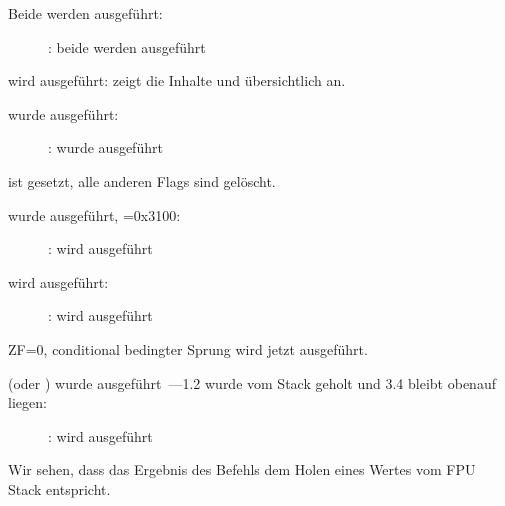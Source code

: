 \clearpage
{}
\myindex{\olly}

Beide \FLD werden ausgeführt:

\begin{figure}[H]
\centering
{}
\caption{\olly: beide \FLD werden ausgeführt}
\label{fig:FPU_comparison_Ox_case1_olly1}
\end{figure}

\FCOM wird ausgeführt: 
\olly zeigt die Inhalte  und  übersichtlich an.

\clearpage
\FCOM wurde ausgeführt:

\begin{figure}[H]
\centering
{}
\caption{\olly: \FCOM wurde ausgeführt}
\label{fig:FPU_comparison_Ox_case1_olly2}
\end{figure}

\Czero ist gesetzt, alle anderen Flags sind gelöscht.

\clearpage
\FNSTSW wurde ausgeführt, =0x3100:

\begin{figure}[H]
\centering
{}
\caption{\olly: \FNSTSW wird ausgeführt}
\label{fig:FPU_comparison_Ox_case1_olly3}
\end{figure}

\clearpage
\TEST wird ausgeführt:

\begin{figure}[H]
\centering
{}
\caption{\olly: \TEST wird ausgeführt}
\label{fig:FPU_comparison_Ox_case1_olly4}
\end{figure}

ZF=0, conditional bedingter Sprung wird jetzt ausgeführt.

\clearpage
{} (oder \FSTP {}) wurde ausgeführt~---1.2 wurde vom Stack geholt und 3.4 bleibt obenauf liegen:

\begin{figure}[H]
\centering
{}
\caption{\olly: \FSTP wird ausgeführt}
\label{fig:FPU_comparison_Ox_case1_olly5}
\end{figure}

Wir sehen, dass das Ergebnis des Befehls  dem Holen eines Wertes vom FPU Stack entspricht. 

